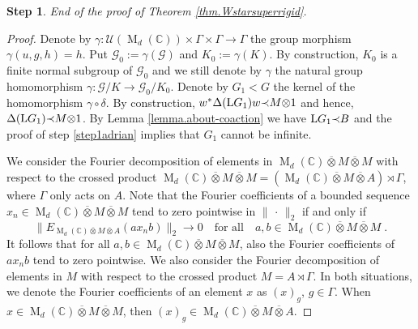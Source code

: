 \documentclass[a4paper,11pt]{amsart}
\numberwithin{equation}{section}
\newtheorem{step}{Step}[section]
\begin{document}
\begin{step}
End of the proof of Theorem \ref{thm.Wstarsuperrigid}.
\end{step}
\begin{proof}
Denote by $\gamma : {\mathcal{U}}({\operatorname{M}}_d({\mathbb{C}})) \times \Gamma \times \Gamma {\rightarrow} \Gamma$ the group morphism $\gamma(u,g,h) = h$. Put ${\mathcal{G}}_0 := \gamma({\mathcal{G}})$ and $K_0 := \gamma(K)$. By construction, $K_0$ is a finite normal subgroup of ${\mathcal{G}}_0$ and we still denote by $\gamma$ the natural group homomorphism $\gamma : {\mathcal{G}}/K {\rightarrow} {\mathcal{G}}_0 / K_0$. Denote by $G_1 < G$ the kernel of the homomorphism $\gamma \circ \delta$. By construction, $w^* {\Delta}({\mathord{\text{\rm L}}} G_1) w {\prec} M {\otimes} 1$ and hence, ${\Delta}({\mathord{\text{\rm L}}} G_1) {\prec} M {\otimes} 1$. By Lemma \ref{lemma.about-coaction} we have ${\mathord{\text{\rm L}}} G_1 {\prec} B$ and the proof of step \ref{step1adrian} implies that $G_1$ cannot be infinite.

We consider the Fourier decomposition of elements in ${\operatorname{M}}_d({\mathbb{C}}) {\mathbin{\overline{\otimes}}} M {\mathbin{\overline{\otimes}}} M$ with respect to the crossed product
${\operatorname{M}}_d({\mathbb{C}}) {\mathbin{\overline{\otimes}}} M {\mathbin{\overline{\otimes}}} M = ({\operatorname{M}}_d({\mathbb{C}}) {\mathbin{\overline{\otimes}}} M {\mathbin{\overline{\otimes}}} A) \rtimes \Gamma$, where $\Gamma$ only acts on $A$. Note that the Fourier coefficients of a bounded sequence $x_n \in {\operatorname{M}}_d({\mathbb{C}}) {\mathbin{\overline{\otimes}}} M {\mathbin{\overline{\otimes}}} M$ tend to zero pointwise in $\| \, \cdot \, \|_2$ if and only if
$$\|E_{{\operatorname{M}}_d({\mathbb{C}}) {\mathbin{\overline{\otimes}}} M {\mathbin{\overline{\otimes}}} A}(a x_n b)\|_2 {\rightarrow} 0 \quad\text{for all}\quad a,b \in {\operatorname{M}}_d({\mathbb{C}}) {\mathbin{\overline{\otimes}}} M {\mathbin{\overline{\otimes}}} M \; .$$
It follows that for all $a,b \in {\operatorname{M}}_d({\mathbb{C}}) {\mathbin{\overline{\otimes}}} M {\mathbin{\overline{\otimes}}} M$, also the Fourier coefficients of $a x_n b$ tend to zero pointwise. We also consider the Fourier decomposition of elements in $M$ with respect to the crossed product $M = A \rtimes \Gamma$. In both situations, we denote the Fourier coefficients of an element $x$ as $(x)_g$, $g \in \Gamma$. When $x \in {\operatorname{M}}_d({\mathbb{C}}) {\mathbin{\overline{\otimes}}} M {\mathbin{\overline{\otimes}}} M$, then $(x)_g \in {\operatorname{M}}_d({\mathbb{C}}) {\mathbin{\overline{\otimes}}} M {\mathbin{\overline{\otimes}}} A$.


\end{proof}
\end{document}
